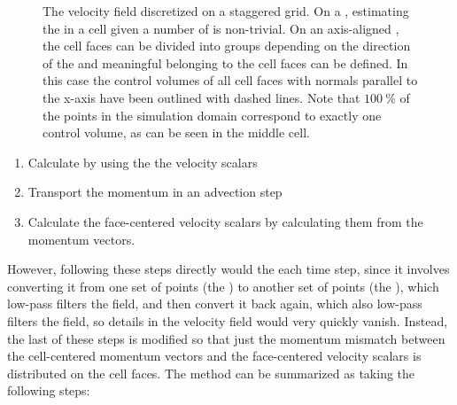 \begin{figure}
{
    }
    \caption{The velocity field discretized on a staggered grid.  On a , estimating the  in a cell given a number of   is non-trivial.  On an axis-aligned , the cell faces can be divided into groups depending on the direction of the  and meaningful  belonging to the cell faces can be defined. In this case the control volumes of all cell faces with normals parallel to the x-axis have been outlined with dashed lines. Note that $100\ \%$ of the points in the simulation domain correspond to exactly one control volume, as can be seen in the middle cell.}
    \label{fig:velocity_advection}
\end{figure}

\begin{enumerate}
    \item Calculate   by using the the  velocity scalars
    \item Transport the momentum in an advection step
    \item Calculate the face-centered velocity scalars by calculating them from the momentum vectors.
\end{enumerate}

However, following these steps directly would  the  each time step, since it involves converting it from one set of points (the ) to another set of points (the ), which low-pass filters the field, and then convert it back again, which also low-pass filters the field, so details in the velocity field would very quickly vanish. Instead, the last of these steps is modified so that just the momentum mismatch between the cell-centered momentum vectors and the face-centered velocity scalars is distributed on the cell faces. The method can be summarized as taking the following steps:

